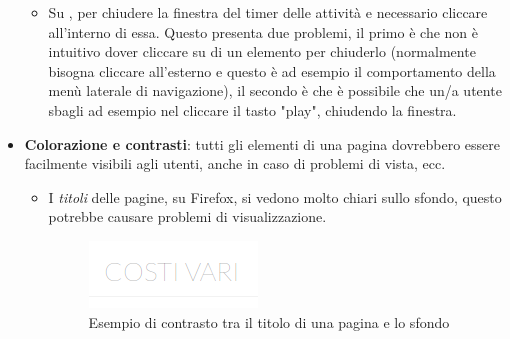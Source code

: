 \begin{itemize}
\begin{itemize}
	\item Su \textit{\resa{}}, per chiudere la finestra del timer delle attività e necessario cliccare
	all'interno di essa. Questo presenta due problemi, il primo è che non è intuitivo dover
	cliccare su di un elemento per chiuderlo (normalmente bisogna cliccare all'esterno e questo
	è ad esempio il comportamento della menù laterale di navigazione), il secondo è che è
	possibile che un/a utente sbagli ad esempio nel cliccare il tasto "play", chiudendo la
	finestra.
	\end{itemize}
\item \textbf{Colorazione e contrasti}: tutti gli elementi di una pagina dovrebbero
essere facilmente visibili agli utenti, anche in caso di problemi di vista, ecc.
	\begin{itemize}
	\item I \textit{titoli} delle pagine, su Firefox, si vedono molto chiari sullo sfondo,
	questo potrebbe causare problemi di visualizzazione.
	
	\begin{figure}[H]\label{imgContrasti}
	\centering
	\includegraphics[width=.4\columnwidth]{images/contrasti.png}
	\caption{Esempio di contrasto tra il titolo di una pagina e lo sfondo}
	\end{figure}
	

\end{itemize}
\end{itemize}
